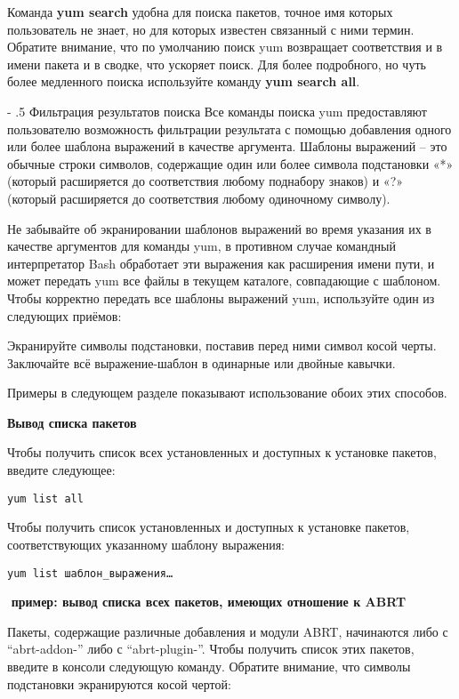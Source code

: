 \documentclass[a4paper,10pt,twoside]{article}
\makeatletter
\renewcommand\paragraph{%
   \@startsection{paragraph}{4}{0mm}%
      {-\baselineskip}%
      {.5\baselineskip}%
      {\normalfont\normalsize\bfseries}}
\makeatother
\begin{document}
Команда \textbf{yum search} удобна для поиска пакетов, точное имя которых пользователь не знает, но для которых известен связанный с ними термин. Обратите внимание, что по умолчанию поиск yum возвращает соответствия и в имени пакета и в сводке, что ускоряет поиск. Для более подробного, но чуть более медленного поиска используйте команду \textbf{yum search all}.

\paragraph{Фильтрация результатов поиска}
Все команды поиска yum предоставляют пользователю возможность фильтрации результата с помощью добавления одного или более шаблона выражений в качестве аргумента. Шаблоны выражений -- это обычные строки символов, содержащие один или более символа подстановки «*» (который расширяется до соответствия любому поднабору знаков) и «?» (который расширяется до соответствия любому одиночному символу).

Не забывайте об экранировании шаблонов выражений во время указания их в качестве аргументов для команды yum, в противном случае командный интерпретатор Bash обработает эти выражения как расширения имени пути, и может передать yum все файлы в текущем каталоге, совпадающие с шаблоном. Чтобы корректно передать все шаблоны выражений yum, используйте один из следующих приёмов:

Экранируйте символы подстановки, поставив перед ними символ косой черты. Заключайте всё выражение-шаблон в одинарные или двойные кавычки.

Примеры в следующем разделе показывают использование обоих этих способов.

\textbf{Вывод списка пакетов}

Чтобы получить список всех установленных и доступных к установке пакетов, введите следующее:
\begin{verbatim}
yum list all\end{verbatim} 
Чтобы получить список установленных и доступных к установке пакетов, соответствующих указанному шаблону выражения:
\begin{verbatim}
yum list шаблон_выражения…\end{verbatim} 
⁠
\textbf{пример: вывод списка всех пакетов, имеющих отношение к ABRT}

Пакеты, содержащие различные добавления и модули ABRT, начинаются либо с “abrt-addon-” либо с “abrt-plugin-”. Чтобы получить список этих пакетов, введите в консоли следующую команду. Обратите внимание, что символы подстановки экранируются косой чертой:
\end{document}
